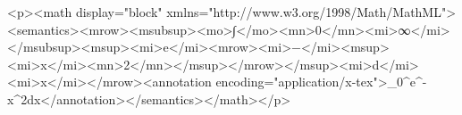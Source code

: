 <p><math display="block" xmlns="http://www.w3.org/1998/Math/MathML"><semantics><mrow><msubsup><mo>∫</mo><mn>0</mn><mi>∞</mi></msubsup><msup><mi>e</mi><mrow><mi>−</mi><msup><mi>x</mi><mn>2</mn></msup></mrow></msup><mi>d</mi><mi>x</mi></mrow><annotation encoding="application/x-tex">\int_{0}^{\infty}e^{- x^{2}}dx</annotation></semantics></math></p>
